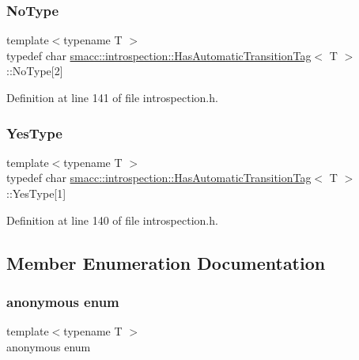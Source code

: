 \subsubsection{\texorpdfstring{No\+Type}{NoType}}
{\footnotesize\ttfamily template$<$typename T $>$ \\
typedef char \hyperlink{classsmacc_1_1introspection_1_1HasAutomaticTransitionTag}{smacc\+::introspection\+::\+Has\+Automatic\+Transition\+Tag}$<$ T $>$\+::No\+Type\mbox{[}2\mbox{]}\hspace{0.3cm}{\ttfamily [private]}}



Definition at line 141 of file introspection.\+h.

\mbox{\label{classsmacc_1_1introspection_1_1HasAutomaticTransitionTag_a750a08a185de0fa20331ba7cfc531dde}} 
\subsubsection{\texorpdfstring{Yes\+Type}{YesType}}
{\footnotesize\ttfamily template$<$typename T $>$ \\
typedef char \hyperlink{classsmacc_1_1introspection_1_1HasAutomaticTransitionTag}{smacc\+::introspection\+::\+Has\+Automatic\+Transition\+Tag}$<$ T $>$\+::Yes\+Type\mbox{[}1\mbox{]}\hspace{0.3cm}{\ttfamily [private]}}



Definition at line 140 of file introspection.\+h.



\subsection{Member Enumeration Documentation}
\mbox{\label{classsmacc_1_1introspection_1_1HasAutomaticTransitionTag_aa4d176f174bc660b4705a0ff3874d4ac}} 
\subsubsection{\texorpdfstring{anonymous enum}{anonymous enum}}
{\footnotesize\ttfamily template$<$typename T $>$ \\
anonymous enum}

